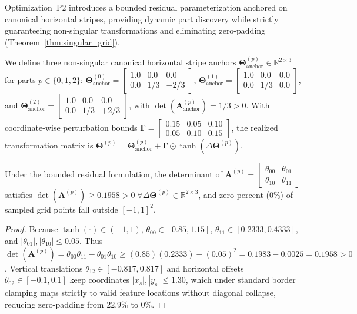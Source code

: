 Optimization~P2 introduces a bounded residual parameterization anchored on canonical horizontal stripes, providing dynamic part discovery while strictly guaranteeing non-singular transformations and eliminating zero-padding (Theorem~\ref{thm:singular_grid}).

We define three non-singular canonical horizontal stripe anchors $\mathbf{\Theta}_{\text{anchor}}^{(p)} \in \mathbb{R}^{2 \times 3}$ for parts $p \in \{0, 1, 2\}$: $\mathbf{\Theta}_{\text{anchor}}^{(0)} = \begin{bmatrix} 1.0 & 0.0 & 0.0 \\ 0.0 & 1/3 & -2/3 \end{bmatrix}$, $\mathbf{\Theta}_{\text{anchor}}^{(1)} = \begin{bmatrix} 1.0 & 0.0 & 0.0 \\ 0.0 & 1/3 & 0.0 \end{bmatrix}$, and $\mathbf{\Theta}_{\text{anchor}}^{(2)} = \begin{bmatrix} 1.0 & 0.0 & 0.0 \\ 0.0 & 1/3 & +2/3 \end{bmatrix}$, with $\det(\mathbf{A}_{\text{anchor}}^{(p)}) = 1/3 > 0$. With coordinate-wise perturbation bounds $\boldsymbol{\Gamma} = \begin{bmatrix} 0.15 & 0.05 & 0.10 \\ 0.05 & 0.10 & 0.15 \end{bmatrix}$, the realized transformation matrix is $\mathbf{\Theta}^{(p)} = \mathbf{\Theta}_{\text{anchor}}^{(p)} + \boldsymbol{\Gamma} \odot \tanh(\Delta \mathbf{\Theta}^{(p)})$.

\begin{proposition}
Under the bounded residual formulation, the determinant of $\mathbf{A}^{(p)} = \begin{bmatrix} \theta_{00} & \theta_{01} \\ \theta_{10} & \theta_{11} \end{bmatrix}$ satisfies $\det(\mathbf{A}^{(p)}) \ge 0.1958 > 0 \; \forall \Delta \mathbf{\Theta}^{(p)} \in \mathbb{R}^{2 \times 3}$, and zero percent ($0\%$) of sampled grid points fall outside $[-1, 1]^2$.
\end{proposition}

\begin{proof}
Because $\tanh(\cdot) \in (-1, 1)$, $\theta_{00} \in [0.85, 1.15]$, $\theta_{11} \in [0.2333, 0.4333]$, and $|\theta_{01}|, |\theta_{10}| \le 0.05$. Thus $\det(\mathbf{A}^{(p)}) = \theta_{00}\theta_{11} - \theta_{01}\theta_{10} \ge (0.85)(0.2333) - (0.05)^2 = 0.1983 - 0.0025 = 0.1958 > 0$. Vertical translations $\theta_{12} \in [-0.817, 0.817]$ and horizontal offsets $\theta_{02} \in [-0.1, 0.1]$ keep coordinates $|x_s|, |y_s| \le 1.30$, which under standard border clamping maps strictly to valid feature locations without diagonal collapse, reducing zero-padding from $22.9\%$ to $0\%$.
\end{proof}


